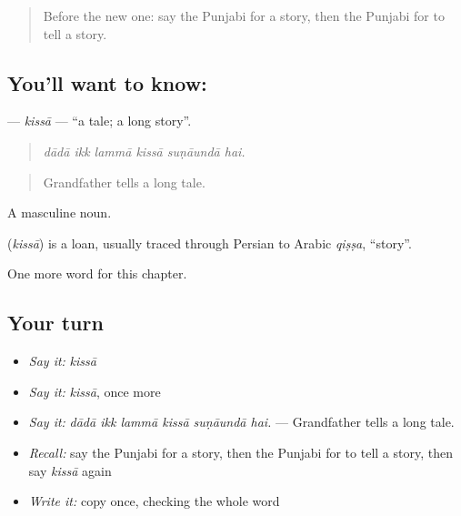 \begin{quote}
Before the new one: say the Punjabi for a story, then the Punjabi for to tell a story.
\end{quote}

\subsection*{You'll want to know: }
\textbf{} — \emph{kissā} — \textquotedblleft{}a tale; a long story\textquotedblright{}.

\begin{quote}
     
\end{quote}

\begin{quote}
\emph{dādā ikk lammā kissā suṇāundā hai.}
\end{quote}

\begin{quote}
Grandfather tells a long tale.
\end{quote}

A masculine noun.

\begin{cousinweb}
\textbf{} (\emph{kissā}) is a loan, usually traced through Persian to Arabic \emph{qiṣṣa}, \textquotedblleft{}story\textquotedblright{}.
\end{cousinweb}

\begin{grammarlens}[title={What you've built}]
One more word for this chapter.
\end{grammarlens}

\subsection*{Your turn}
\begin{itemize}
\raggedright
  \item \emph{Say it:} \emph{kissā}
  \item \emph{Say it:} \emph{kissā}, once more
  \item \emph{Say it:} \emph{dādā ikk lammā kissā suṇāundā hai.} — Grandfather tells a long tale.
  \item \emph{Recall:} say the Punjabi for a story, then the Punjabi for to tell a story, then say \emph{kissā} again
  \item \emph{Write it:} copy \textbf{} once, checking the whole word
\end{itemize}

